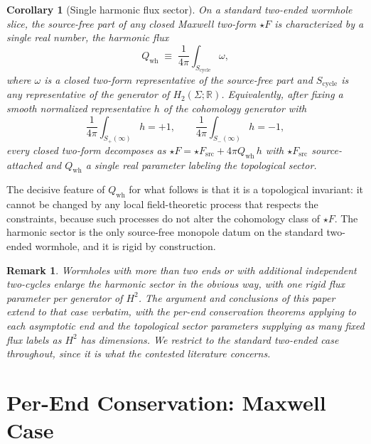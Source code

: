 \documentclass[aps,prd,onecolumn,nofootinbib,superscriptaddress]{revtex4-2}
\newtheorem{corollary}{Corollary}
\newtheorem{remark}{Remark}
\begin{document}
\begin{corollary}[Single harmonic flux sector]
\label{cor:single-sector}
On a standard two-ended wormhole slice, the source-free part of any closed Maxwell two-form $\star F$ is characterized by a single real number, the harmonic flux
\begin{equation}
Q_{\mathrm{wh}} \;\equiv\; \frac{1}{4\pi}\int_{S_\mathrm{cycle}} \omega,
\end{equation}
where $\omega$ is a closed two-form representative of the source-free part and $S_\mathrm{cycle}$ is any representative of the generator of $H_2(\Sigma;\mathbb{R})$. Equivalently, after fixing a smooth normalized representative $h$ of the cohomology generator with
\begin{equation}
\frac{1}{4\pi}\int_{S_+(\infty)} h = +1,\qquad \frac{1}{4\pi}\int_{S_-(\infty)} h = -1,
\end{equation}
every closed two-form decomposes as $\star F = \star F_{\mathrm{src}} + 4\pi Q_{\mathrm{wh}}\, h$ with $\star F_{\mathrm{src}}$ source-attached and $Q_{\mathrm{wh}}$ a single real parameter labeling the topological sector.
\end{corollary}

The decisive feature of $Q_{\mathrm{wh}}$ for what follows is that it is a topological invariant: it cannot be changed by any local field-theoretic process that respects the constraints, because such processes do not alter the cohomology class of $\star F$. The harmonic sector is the only source-free monopole datum on the standard two-ended wormhole, and it is rigid by construction.

\begin{remark}
Wormholes with more than two ends or with additional independent two-cycles enlarge the harmonic sector in the obvious way, with one rigid flux parameter per generator of $H^2$. The argument and conclusions of this paper extend to that case verbatim, with the per-end conservation theorems applying to each asymptotic end and the topological sector parameters supplying as many fixed flux labels as $H^2$ has dimensions. We restrict to the standard two-ended case throughout, since it is what the contested literature concerns.
\end{remark}

\section{Per-End Conservation: Maxwell Case}
\label{sec:maxwell}
\end{document}
